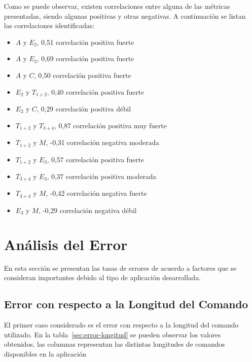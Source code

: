 Como se puede observar, existen correlaciones entre alguna de las m\'etricas presentadas, 
siendo algunas positivas y otras negativas. A continuaci\'on se listan las correlaciones identificadas:

\begin{itemize}
    \item $A$ y $E_2$, 0,51 correlaci\'on positiva fuerte
    \item $A$ y $E_3$, 0,69 correlaci\'on positiva fuerte
    \item $A$ y $C$, 0,50 correlaci\'on positiva fuerte 
    \item $E_2$ y $T_{1+2}$, 0,40 correlaci\'on positiva fuerte
    \item $E_2$ y $C$, 0,29 correlaci\'on positiva d\'ebil
    \item $T_{1+2}$ y $T_{3+4}$, 0,87 correlaci\'on positiva muy fuerte
    \item $T_{1+2}$ y $M$, -0,31 correlaci\'on negativa moderada
    \item $T_{1+2}$ y $E_3$, 0,57 correlaci\'on positiva fuerte
    \item $T_{3+4}$ y $E_3$, 0,37 correlaci\'on positiva moderada
    \item $T_{3+4}$ y $M$, -0,42 correlaci\'on negativa fuerte
    \item $E_3$ y $M$, -0,29 correlaci\'on negativa d\'ebil
\end{itemize}


\section{An\'alisis del Error}

En esta secci\'on se presentan las tasas de errores de acuerdo a factores que se consideran importantes debido
al tipo de aplicaci\'on desarrollada. 

\subsection{Error con respecto a la Longitud del Comando}
El primer caso considerado es el error con respecto a la longitud del comando
utilizado. En la tabla~\ref{sec:error-longitud} se pueden observar los valores obtenidos, las columnas
representan las distintas longitudes de comandos disponibles en la aplicaci\'on

